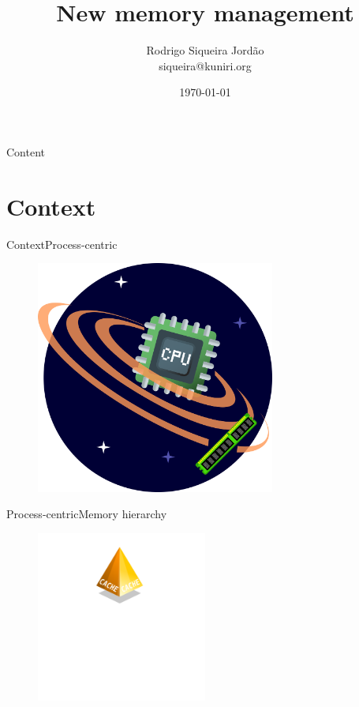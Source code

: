 \documentclass[10pt]{beamer}
\title[] %
{ %
      \textbf{New memory management}
}
\subtitle[SpaceJMP a new approach]
{
}
\author[Rodrigo Siqueira Jordão]
{      Rodrigo Siqueira Jordão\\
      {\ttfamily siqueira@kuniri.org}
}
\institute[]
{
      University of Sao Paulo\\
      Institute of Mathematics and Statistics\\

}
\date{\today}
\begin{document}

{\1%
\begin{frame}
  \titlepage %
\end{frame}}

\begin{frame}{Content}{}
  \tableofcontents
\end{frame}

\section{Context}
\begin{frame}{Context}{Process-centric}
  \begin{figure}[ht]
    \centering
    \includegraphics[width=0.7\textwidth, keepaspectratio=true]{images/cpu_centric.png}
  \end{figure}
\end{frame}

\begin{frame}{Process-centric}{Memory hierarchy}
  \begin{figure}[ht]
    \centering
    \includegraphics[width=0.5\textwidth, keepaspectratio=true]{images/memory_hierarchy_cache.png}
  \end{figure}
\end{frame}
\end{document}
